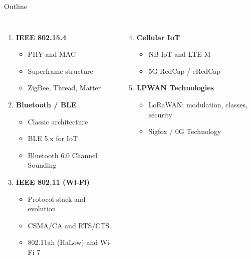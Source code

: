\documentclass[aspectratio=169,11pt]{beamer}
\begin{document}
\begin{frame}{Outline}
    \begin{columns}
        \begin{enumerate}
            \item \textbf{IEEE 802.15.4}
            \begin{itemize}
                \item PHY and MAC
                \item Superframe structure
                \item ZigBee, Thread, Matter
            \end{itemize}
            
            \item \textbf{Bluetooth / BLE}
            \begin{itemize}
                \item Classic architecture
                \item BLE 5.x for IoT
                \item Bluetooth 6.0 Channel Sounding
            \end{itemize}
            
            \item \textbf{IEEE 802.11 (Wi-Fi)}
            \begin{itemize}
                \item Protocol stack and evolution
                \item CSMA/CA and RTS/CTS
                \item 802.11ah (HaLow) and Wi-Fi 7
            \end{itemize}
        \end{enumerate}
        
        \begin{enumerate}
            \setcounter{enumi}{3}
            \item \textbf{Cellular IoT}
            \begin{itemize}
                \item NB-IoT and LTE-M
                \item 5G RedCap / eRedCap
            \end{itemize}
            
            \item \textbf{LPWAN Technologies}
            \begin{itemize}
                \item LoRaWAN: modulation, classes, security
                \item Sigfox / 0G Technology
            \end{itemize}
            

\end{enumerate}
\end{columns}
\end{frame}
\end{document}
